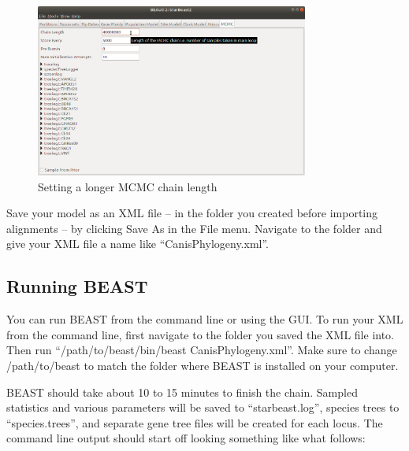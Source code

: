 \documentclass[12pt]{article}
\begin{document}
\begin{figure}[htb!]
\centering
\includegraphics[width=0.8\textwidth]{figures/chainLength.png}
\caption
{Setting a longer MCMC chain length}
\label{fig:chainLength}
\end{figure}

\newpage{}

Save your model as an XML file -- in the folder you created before importing
alignments -- by clicking Save As in the File menu. Navigate to the folder
and give your XML file a name like ``CanisPhylogeny.xml''.

\subsection{Running BEAST}
\label{subsec:runningBEAST}

You can run BEAST from the command line or using the GUI. To run your XML
from the command line, first navigate to the folder you saved the XML file into.
Then run ``/path/to/beast/bin/beast CanisPhylogeny.xml''. Make sure to change
/path/to/beast to match the folder where BEAST is installed on your computer.

BEAST should take about 10 to 15 minutes to finish the chain. Sampled statistics
and various parameters will be saved to ``starbeast.log'', species trees to
``species.trees'', and separate gene tree files will be created for each locus. The command line
output should start off looking something like what follows:
\end{document}
